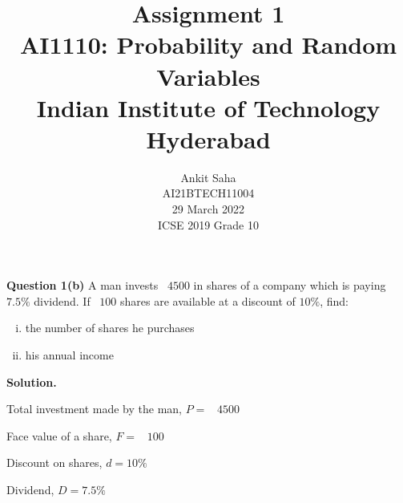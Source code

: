 \documentclass[journal,12pt,twocolumn]{IEEEtran}
\title{Assignment 1 \\ \Large AI1110: Probability and Random Variables \\ \large Indian Institute of Technology Hyderabad}
\author{Ankit Saha \\ \normalsize AI21BTECH11004 \\ \vspace*{20pt} \normalsize  29 March 2022 \\ \vspace*{20pt} \Large ICSE 2019 Grade 10}
\begin{document}
	\maketitle
	
	\textbf{Question 1(b)} 
	A man invests \rupee~$4500$ in shares of a company which is paying $7.5\%$ dividend. If \rupee~$100$ shares are available at a discount of $10\%$, find:
	\begin{enumerate}[(i)]
		\item the number of shares he purchases
		\item his annual income
	\end{enumerate}
	
	\vspace*{10pt}
	
	\textbf{Solution.}
	
	Total investment made by the man, $P = $ \rupee~$4500$
	
	Face value of a share, $F = $ \rupee~$100$
	
	Discount on shares, $d = 10\%$
	
	Dividend, $D = 7.5\%$
	
	\vspace*{5pt}	
	
\end{document}
